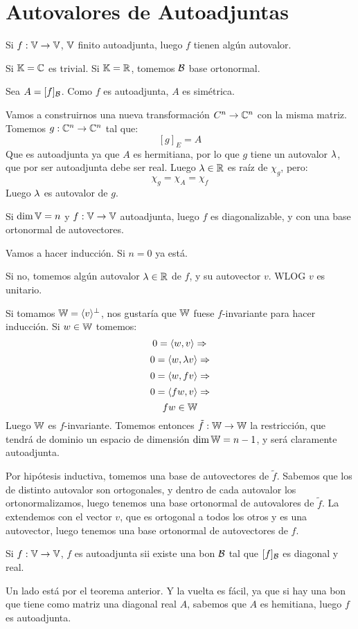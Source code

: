 \documentclass{article}
\begin{document}
\section*{Autovalores de Autoadjuntas}
\begin{teo}
    Si $f : \mathbb{V} \to \mathbb{V}$, $\mathbb{V}$ finito autoadjunta, luego $f$ tienen algún autovalor.
\end{teo}
\begin{demo}
    Si $\mathbb{K} = \mathbb{C}$ es trivial.
    Si $\mathbb{K} = \mathbb{R}$, tomemos $\mathcal{B}$ base ortonormal.

    Sea $A = [f]_{\mathcal{B}}$. Como $f$ es autoadjunta, $A$ es simétrica.

    Vamos a construirnos una nueva transformación $C^n \to \mathbb{C}^n$ con la misma matriz. Tomemos $g : \mathbb{C}^n \to \mathbb{C}^n$ tal que:
    \[
        [g]_E = A
    \]
    Que es autoadjunta ya que $A$ es hermitiana, por lo que $g$ tiene un autovalor $\lambda$, que por ser autoadjunta debe ser real.
    Luego $\lambda \in \mathbb{R}$ es raíz de $\chi_g$, pero:
    \[\chi_g = \chi_A = \chi_f\]
    Luego $\lambda$ es autovalor de $g$.
\end{demo}
\begin{teo}
    Si $\dim \mathbb{V} = n$ y $f : \mathbb{V} \to \mathbb{V}$ autoadjunta, luego $f$ es diagonalizable, y con una base ortonormal de autovectores.
\end{teo}
\begin{demo}
    Vamos a hacer inducción. Si $n = 0$ ya está.

    Si no, tomemos algún autovalor $\lambda \in \mathbb{R}$ de $f$, y su autovector $v$. WLOG $v$ es unitario.

    Si tomamos $\mathbb{W} = \langle v \rangle ^\perp$, nos gustaría que $\mathbb{W}$ fuese $f$-invariante para hacer inducción. Si $w \in \mathbb{W}$ tomemos:
    \[0 = \langle w, v\rangle \Rightarrow\]
    \[0 = \langle w, \lambda v\rangle \Rightarrow\]
    \[0 = \langle w, fv\rangle \Rightarrow\]
    \[0 = \langle fw, v\rangle \Rightarrow\]
    \[fw \in \mathbb{W}\]
    Luego $\mathbb{W}$ es $f$-invariante. Tomemos entonces $\tilde f : \mathbb{W} \to \mathbb{W}$ la restricción, que tendrá de dominio un espacio de dimensión $\dim \mathbb{W} = n-1$, y será claramente autoadjunta.

    Por hipótesis inductiva, tomemos una base de autovectores de $\tilde f$. Sabemos que los de distinto autovalor son ortogonales, y dentro de cada autovalor los ortonormalizamos, luego tenemos una base ortonormal de autovalores de $\tilde f$. La extendemos con el vector $v$, que es ortogonal a todos los otros y es una autovector, luego tenemos una base ortonormal de autovectores de $f$.
\end{demo}
\begin{teo}
    Si $f : \mathbb{V} \to \mathbb{V}$, $f$ es autoadjunta sii existe una bon $\mathcal{B}$ tal que $[f]_{\mathcal{B}}$ es diagonal y real.
\end{teo}
\begin{demo}
    Un lado está por el teorema anterior. Y la vuelta es fácil, ya que si hay una bon que tiene como matriz una diagonal real $A$, sabemos que $A$ es hemitiana, luego $f$ es autoadjunta.
\end{demo}
\end{document}
